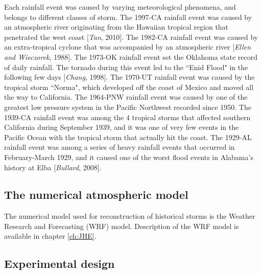 Each rainfall event was caused by varying meteorological phenomena, and belongs to different classes of storm. The 1997-CA rainfall event was caused by an atmospheric river originating from the Hawaiian tropical region that penetrated the west coast [\textit{Tan}, 2010]. The 1982-CA rainfall event was caused by an extra-tropical cyclone that was accompanied by an atmospheric river [\textit{Ellen and Wieczorek}, 1988]. The 1973-OK rainfall event set the Oklahoma state record of daily rainfall. The tornado during this event led to the ``Enid Flood" in the following few days [\textit{Chang}, 1998]. The 1970-UT rainfall event was caused by the tropical storm ``Norma", which developed off the coast of Mexico and moved all the way to California. The 1964-PNW rainfall event was caused by one of the greatest low pressure system in the Pacific Northwest recorded since 1950. The 1939-CA rainfall event was among the 4 tropical storms that affected southern California during September 1939, and it was one of very few events in the Pacific Ocean with the tropical storm that actually hit the coast. The 1929-AL rainfall event was among a series of heavy rainfall events that occurred in February-March 1929, and it caused one of the worst flood events in Alabama’s history at Elba [\textit{Bullard}, 2008].

\subsection{The numerical atmospheric model}

The numerical model used for reconstruction of historical storms is the Weather Research and Forecasting (WRF) model. Description of the WRF model is available in chapter \ref{ch:JHE}.

\subsection{Experimental design}

